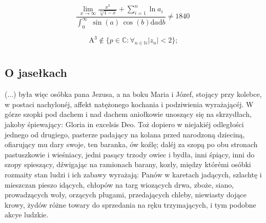 \documentclass{book}
\begin{document}
\begin{equation}
    \frac{\lim_{x \rightarrow \infty} \frac{x^3}{\sqrt[15]{1 - x} } + \sum_{i=1}^n \ln a_i} {\int_0^{\infty} \; \sin (a) \, \cos (b) \mathrm{d}a \mathrm{d}b} \neq 1840 \;
    \label{eqn:data}
\end{equation}

\begin{equation}
    \text{A}^3 \notin \{p \in \mathbb{C} : \forall_{n \in \mathbb{N}} |z_n|<2 \};
    \label{eqn:krol}
\end{equation}

\chapter{}
\section{O jasełkach}
(...) była więc osóbka pana Jezusa, a na boku Maria i Józef, stojący przy kolebce, w postaci nachylonéj, affekt natężonego kochania i podziwienia wyrażającéj. W górze szopki pod dachem i nad dachem aniołkowie unoszący się na skrzydłach, jakoby śpiewający: Gloria in excelsis Deo. Toż dopiero w niejakiéj odległości jednego od drugiego, pasterze padający na kolana przed narodzoną dzieciną, ofiarujący mu dary swoje, ten baranka, ów koźlę; daléj za szopą po obu stronach pastuszkowie i wieśniacy, jedni pasący trzody owiec i bydła, inni śpiący, inni do szopy spieszący, dźwigając na ramionach barany, kozły, między którémi osóbki rozmaity stan ludzi i ich zabawy wyrażają: Panów w karetach jadących, szlachtę i mieszczan pieszo idących, chłopów na targ wiozących drwa, zboże, siano, prowadzących woły, orzących pługami, przedających chleby, niewiasty dojące krowy, żydów różne towary do sprzedania na ręku trzymających, i tym podobne akcye ludzkie.
\end{document}
